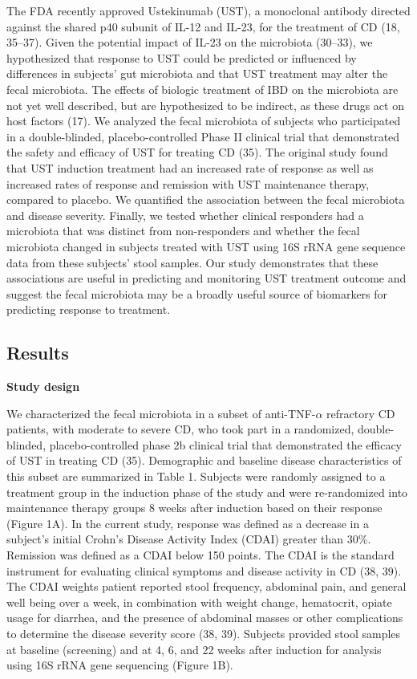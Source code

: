 \documentclass[12pt,]{article}
\begin{document}
The FDA recently approved Ustekinumab (UST), a monoclonal antibody
directed against the shared p40 subunit of IL-12 and IL-23, for the
treatment of CD (18, 35--37). Given the potential impact of IL-23 on the
microbiota (30--33), we hypothesized that response to UST could be
predicted or influenced by differences in subjects' gut microbiota and
that UST treatment may alter the fecal microbiota. The effects of
biologic treatment of IBD on the microbiota are not yet well described,
but are hypothesized to be indirect, as these drugs act on host factors
(17). We analyzed the fecal microbiota of subjects who participated in a
double-blinded, placebo-controlled Phase II clinical trial that
demonstrated the safety and efficacy of UST for treating CD (35). The
original study found that UST induction treatment had an increased rate
of response as well as increased rates of response and remission with
UST maintenance therapy, compared to placebo. We quantified the
association between the fecal microbiota and disease severity. Finally,
we tested whether clinical responders had a microbiota that was distinct
from non-responders and whether the fecal microbiota changed in subjects
treated with UST using 16S rRNA gene sequence data from these subjects'
stool samples. Our study demonstrates that these associations are useful
in predicting and monitoring UST treatment outcome and suggest the fecal
microbiota may be a broadly useful source of biomarkers for predicting
response to treatment.

\subsection{Results}\label{results}

\textbf{Study design}

We characterized the fecal microbiota in a subset of
anti-TNF-\({\alpha}\) refractory CD patients, with moderate to severe
CD, who took part in a randomized, double-blinded, placebo-controlled
phase 2b clinical trial that demonstrated the efficacy of UST in
treating CD (35). Demographic and baseline disease characteristics of
this subset are summarized in Table 1. Subjects were randomly assigned
to a treatment group in the induction phase of the study and were
re-randomized into maintenance therapy groups 8 weeks after induction
based on their response (Figure 1A). In the current study, response was
defined as a decrease in a subject's initial Crohn's Disease Activity
Index (CDAI) greater than 30\%. Remission was defined as a CDAI below
150 points. The CDAI is the standard instrument for evaluating clinical
symptoms and disease activity in CD (38, 39). The CDAI weights patient
reported stool frequency, abdominal pain, and general well being over a
week, in combination with weight change, hematocrit, opiate usage for
diarrhea, and the presence of abdominal masses or other complications to
determine the disease severity score (38, 39). Subjects provided stool
samples at baseline (screening) and at 4, 6, and 22 weeks after
induction for analysis using 16S rRNA gene sequencing (Figure 1B).
\end{document}
